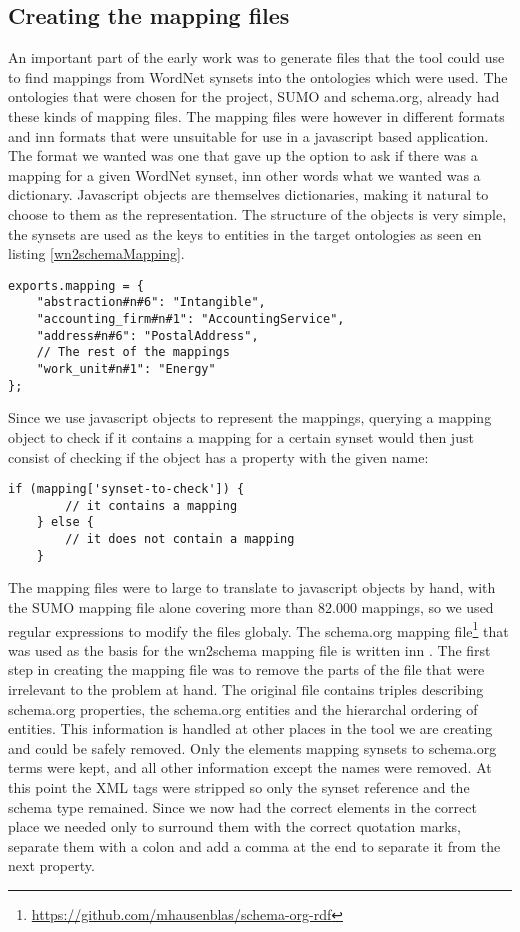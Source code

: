 \subsection{Creating the mapping files}
An important part of the early work was to generate files that the tool could use to find mappings from WordNet synsets
into the ontologies which were used.
The ontologies that were chosen for the project, SUMO  and schema.org, already had these kinds of mapping files.
The mapping files were however in different formats and inn formats that were unsuitable for use in a javascript based application.
The format we wanted was one that gave up the option to ask if there was a mapping for a given WordNet synset,
inn other words what we wanted was a dictionary.
Javascript objects are themselves dictionaries, making it natural to choose to them as the representation.
The structure of the objects is very simple,
the synsets are used as the keys to entities in the target ontologies as seen en listing \ref{wn2schemaMapping}.

\begin{lstlisting}[label=wn2schemaMapping,caption={Excerpt from the \href{https://github.com/EivindEE/Madame/blob/master/mappings/wn2schema.js}{wn2schema.js} mapping file}]
exports.mapping = {
	"abstraction#n#6": "Intangible",
	"accounting_firm#n#1": "AccountingService",
	"address#n#6": "PostalAddress",
	// The rest of the mappings
	"work_unit#n#1": "Energy"
};
\end{lstlisting}

Since we use javascript objects to represent the mappings, querying a mapping object to check if it contains a mapping for a certain synset would then just consist of checking if
the object has a property with the given name:
\begin{lstlisting}[caption=Testing if a mapping exists]
    if (mapping['synset-to-check']) {
        // it contains a mapping
    } else {
        // it does not contain a mapping
    }
\end{lstlisting}

The mapping files were to large to translate to javascript objects by hand, with the SUMO mapping file alone
covering more than 82.000 mappings, so we used regular expressions to modify the files globaly.
The schema.org mapping file\footnote{\url{https://github.com/mhausenblas/schema-org-rdf}}
that was used as the basis for the wn2schema mapping file is written inn .
The first step in creating the mapping file was to remove the parts of the file that were irrelevant to the problem at hand.
The original file contains triples describing schema.org properties,
the schema.org entities and the hierarchal ordering of entities.
This information is handled at other places in the tool we are creating and could be safely removed.
Only the elements mapping synsets to schema.org terms were kept, and all other information except the names were removed.
At this point the XML tags were stripped so only the synset reference and the schema type remained.
Since we now had the correct elements in the correct place we needed only to surround them with the correct quotation
marks, separate them with a colon and add a comma at the end to separate it from the next property.

